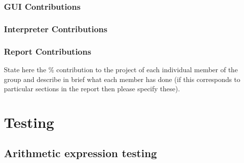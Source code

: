 \documentclass[a4paper, oneside, 11pt]{report}
\begin{document}
\subsection{GUI Contributions}
\subsection{Interpreter Contributions}
\subsection{Report Contributions}

State here the \% contribution to the project of each individual member of the group and describe in brief what each member has done (if this corresponds to particular sections in the report then please specify these).

\chapter{Testing}
\label{app:test}
\section{Arithmetic expression testing} \label{ArithTest}
\end{document}
